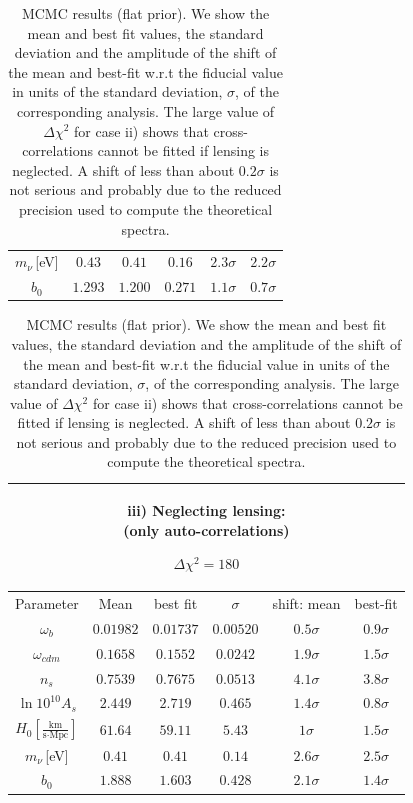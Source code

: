 \begin{table}[!t]
\begin{tabular}{@{}cccccc}
    $m_{\nu}$\,[eV]  & $0.43$ & $0.41$ & $0.16$ &  \quad$2.3\sigma$ & $2.2\sigma$ \\
    $b_0$ & $1.293$ & $1.200$ & $0.271$ & \quad$1.1\sigma$ & $0.7\sigma$\\
  \end{tabular}
  \begin{tabular}{@{}cccccc}
    \hline
    \multicolumn{6}{c}{\parbox[t]{4.4cm}{iii) Neglecting lensing: \\ \hspace*{0.9cm} (only auto-correlations)} $\Delta \chi^2 = 180$} \\
    \hline
    Parameter & Mean & best fit & $\sigma$ & \hspace{-0.52cm} shift: mean & best-fit\\
    \hline
    $\omega_b$ & $0.01982 $ & $0.01737 $ & $0.00520 $ &  \quad$0.5\sigma$ & $0.9\sigma$ \\
    $\omega_{cdm}$ & $0.1658 $ & $0.1552 $ & $0.0242 $ &  \quad$1.9\sigma$ & $1.5\sigma$ \\
    $n_s$      & $0.7539 $ & $0.7675 $ & $0.0513 $ &  \quad$4.1\sigma$ & $3.8\sigma$ \\
    $\ln10^{10}A_s$ & $2.449 $ & $2.719 $ & $0.465 $ &  \quad$1.4 \sigma$ & $0.8\sigma$ \\
    $H_0\left[\frac{\text{km}}{\text{s}\cdot\text{Mpc}}\right]$      & $61.64 $ & $59.11$ & $5.43$ &  \quad$1 \sigma$ & $1.5\sigma$ \\
    $m_{\nu}$\,[eV]  & $0.41$ & $0.41$ & $0.14$ &  \quad$2.6\sigma$ & $2.5\sigma$ \\
    $b_0$ & $1.888$ & $1.603$ & $0.428$ & \quad$2.1\sigma$ & $1.4\sigma$ \\
  \end{tabular}

  \caption{MCMC results (flat prior). We show the mean and best fit values, the standard deviation and the amplitude of the shift of the mean and best-fit w.r.t the fiducial value in units of the standard deviation, $\sigma$, of the corresponding analysis. The large value of $\Delta \chi^2$ for case ii) shows that cross-correlations cannot be fitted if lensing is neglected.  A shift of less than about $0.2\sigma$ is not serious and probably due to the reduced precision used to compute the theoretical spectra.}
  \label{Table:1}
\end{table}

